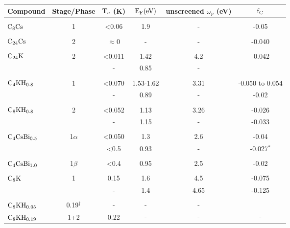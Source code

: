 
%


\begin{tabular}{|lc|cccc|}
Compound & Stage/Phase & $\rm T_c$ (K) & $\rm E_F (eV)$ & unscreened $\omega_p$ (eV) & $\rm f_C$ \\
\hline\\
$\rm C_8Cs$ & 1 & <0.06\cite{tanuma81} & 1.9\cite{lagues84}&-& -0.05\cite{takahashi86,dicenzo86}\\
& & & & & \\
$\rm C_{24}Cs$ & 2 & $\approx$0 &-&-& -0.040\cite{fretigny85}\\
& & & & & \\
$\rm C_{24}K$ & 2 & <0.011\cite{koike80} & 1.42\cite{doll87} & 4.2\cite{doll87} & -0.042\cite{doll87,I63,preil84}\\
& &-& 0.85\cite{preil84,preil83} &-& \\
& & & & & \\
$\rm C_4KH_{0.8}$& 1 & <0.070 & 1.53-1.62\cite{doll87} & 3.31\cite{doll87} & -0.050 to 0.054\cite{doll87}\\
& &-& 0.89\cite{O353} & - & -0.02\cite{Z260}\\
& & & & & \\
$\rm C_8KH_{0.8}$ & 2 & <0.052\cite{sano80} & 1.13\cite{doll87} & 3.26\cite{doll87} & -0.026\cite{doll87} \\
& &-& 1.15\cite{Z260} &-& -0.033\cite{Z260}\\
& & & & & \\
$\rm C_4CsBi_{0.5}$ & 1$\alpha$ & <0.050\cite{stang88} & 1.3\cite{yang88} & 2.6\cite{yang88} & -0.04\cite{yang88}\\
& & <0.5\cite{E291} & 0.93\cite{E291} &-& -0.027$^*$\\
& & & & & \\
$\rm C_4CsBi_{1.0}$ & 1$\beta$ & <0.4\cite{E291} & 0.95\cite{yang88} & 2.5\cite{yang88} & -0.02\cite{yang88}\\
& & & & & \\
$\rm C_8K$ & 1 & 0.15\cite{kaneiwa82} & 1.6\cite{doll87} & 4.5\cite{doll87} & -0.075\cite{tanuma78}\\
& &-& 1.4\cite{tanuma78} & 4.65\cite{fischer85} & -0.125\cite{preil84}\\
& & & & & \\
$\rm C_8KH_{0.05}$ & 0.19$^{\dagger}$\cite{enoki85} & - & - & -\\
$\rm C_8KH_{0.19}$ & 1+2 & 0.22\cite{kaneiwa82} & - & - & -\\

\end{tabular}

